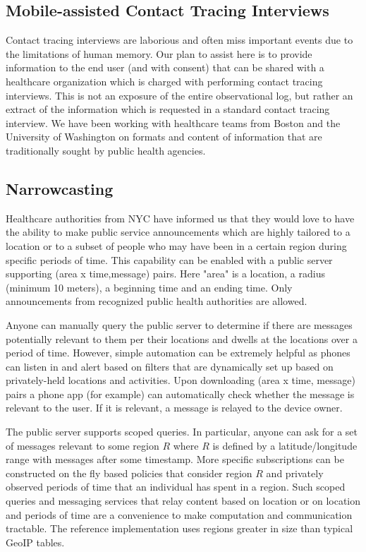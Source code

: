 \documentclass{article}
\begin{document}
\subsection{Mobile-assisted Contact Tracing Interviews} 
Contact tracing interviews are laborious and often miss important events due to the limitations of human memory.  Our plan to assist here is to provide information to the end user (and with consent) that can be shared with a healthcare organization which is charged with performing contact tracing interviews.   This is not an exposure of the entire observational log, but rather an extract of the information which is requested in a standard contact tracing interview. We have been working with healthcare teams from Boston and the University of Washington on formats and content of information that are traditionally sought by public health agencies.

\subsection{Narrowcasting}

Healthcare authorities from NYC have informed us that they would love to have the ability to make public service announcements which are highly tailored to a location or to a subset of people who may have been in a certain region during specific periods of time.  This capability can be enabled with a public server supporting (area x time,message) pairs.  Here "area" is a location, a radius (minimum 10 meters), a beginning time and an ending time.  Only announcements from recognized public health authorities are allowed.  

Anyone can manually query the public server to determine if there are messages potentially relevant to them per their locations and dwells at the locations over a period of time. However, simple automation can be extremely helpful as phones can listen in and alert based on filters that are dynamically set up based on privately-held locations and activities. Upon downloading (area x time, message) pairs a phone app (for example) can automatically check whether the message is relevant to the user.  If it is relevant, a message is relayed to the device owner.

The public server supports scoped queries.  In particular, anyone can ask for a set of messages relevant to some region $R$ where $R$ is defined by a latitude/longitude range with messages after some timestamp.  More specific subscriptions can be constructed on the fly based policies that consider region $R$ and privately observed periods of time that an individual has spent in a region. Such scoped queries and messaging services that relay content based on location or on location and periods of time are a convenience to make computation and communication tractable.  The reference implementation uses regions greater in size than typical GeoIP tables.
\end{document}
